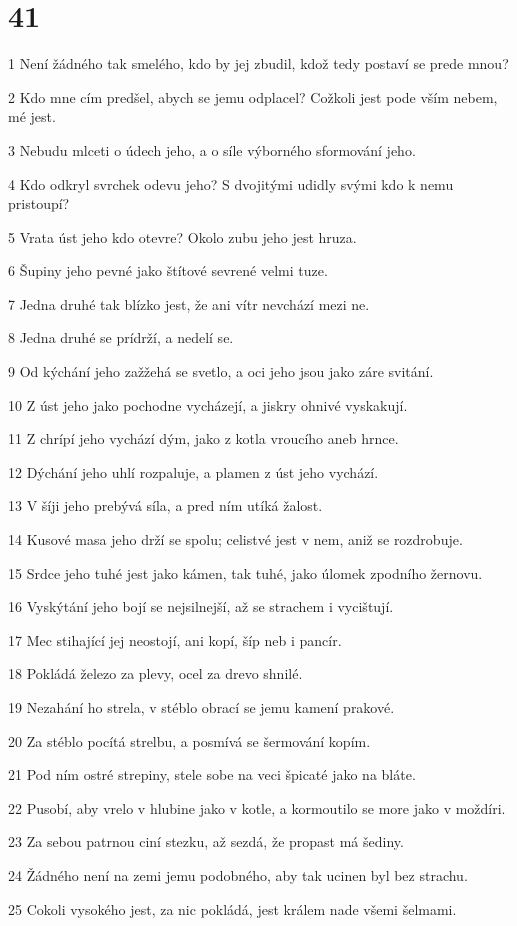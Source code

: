 \chapter{41}

\par 1 Není žádného tak smelého, kdo by jej zbudil, kdož tedy postaví se prede mnou?
\par 2 Kdo mne cím predšel, abych se jemu odplacel? Cožkoli jest pode vším nebem, mé jest.
\par 3 Nebudu mlceti o údech jeho, a o síle výborného sformování jeho.
\par 4 Kdo odkryl svrchek odevu jeho? S dvojitými udidly svými kdo k nemu pristoupí?
\par 5 Vrata úst jeho kdo otevre? Okolo zubu jeho jest hruza.
\par 6 Šupiny jeho pevné jako štítové sevrené velmi tuze.
\par 7 Jedna druhé tak blízko jest, že ani vítr nevchází mezi ne.
\par 8 Jedna druhé se prídrží, a nedelí se.
\par 9 Od kýchání jeho zažžehá se svetlo, a oci jeho jsou jako záre svitání.
\par 10 Z úst jeho jako pochodne vycházejí, a jiskry ohnivé vyskakují.
\par 11 Z chrípí jeho vychází dým, jako z kotla vroucího aneb hrnce.
\par 12 Dýchání jeho uhlí rozpaluje, a plamen z úst jeho vychází.
\par 13 V šíji jeho prebývá síla, a pred ním utíká žalost.
\par 14 Kusové masa jeho drží se spolu; celistvé jest v nem, aniž se rozdrobuje.
\par 15 Srdce jeho tuhé jest jako kámen, tak tuhé, jako úlomek zpodního žernovu.
\par 16 Vyskýtání jeho bojí se nejsilnejší, až se strachem i vycištují.
\par 17 Mec stihající jej neostojí, ani kopí, šíp neb i pancír.
\par 18 Pokládá železo za plevy, ocel za drevo shnilé.
\par 19 Nezahání ho strela, v stéblo obrací se jemu kamení prakové.
\par 20 Za stéblo pocítá strelbu, a posmívá se šermování kopím.
\par 21 Pod ním ostré strepiny, stele sobe na veci špicaté jako na bláte.
\par 22 Pusobí, aby vrelo v hlubine jako v kotle, a kormoutilo se more jako v moždíri.
\par 23 Za sebou patrnou ciní stezku, až sezdá, že propast má šediny.
\par 24 Žádného není na zemi jemu podobného, aby tak ucinen byl bez strachu.
\par 25 Cokoli vysokého jest, za nic pokládá, jest králem nade všemi šelmami.

